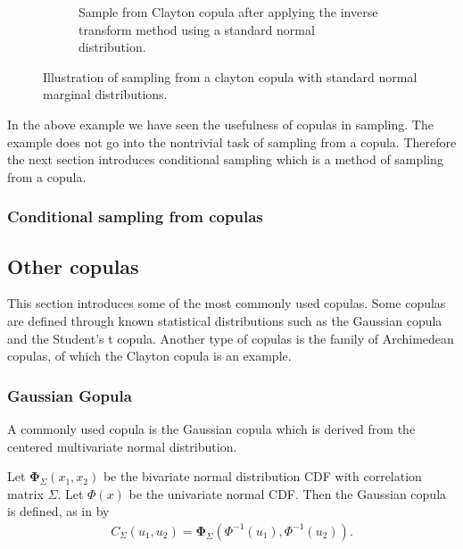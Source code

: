 \begin{figure}[h]
\begin{subfigure}[t]{0.45\linewidth}
        \caption{Sample from Clayton copula after applying the inverse transform method using a standard normal distribution.}
        \label{fig:ReturnSpaceDataClayton}
    \end{subfigure}
    \caption{Illustration of sampling from a clayton copula with standard normal marginal distributions.}
    \label{fig:CopulaSampling}
\end{figure}


In the above example we have seen the usefulness of copulas in sampling. The example does not go into the nontrivial task of sampling from a copula. Therefore the next section introduces conditional sampling which is a method of sampling from a copula. 

\subsubsection{Conditional sampling from copulas}


\subsection{Other copulas}
This section introduces some of the most commonly used copulas. Some copulas are defined through known statistical distributions such as the Gaussian copula and the Student's t copula. Another type of copulas is the family of Archimedean copulas, of which the Clayton copula is an example.

\subsubsection{Gaussian Gopula} 
A commonly used copula is the Gaussian copula which is derived from the centered multivariate normal distribution. 

Let $\boldsymbol{\Phi}_\Sigma(x_1,x_2)$ be the bivariate normal distribution \gls{CDF} with correlation matrix $\Sigma$. Let $\Phi(x)$ be the univariate normal \gls{CDF}. Then the Gaussian copula is defined, as in \citet[p.~112]{Umberto2004copulaMethods}  by 
\begin{align*}
    C_\Sigma(u_1,u_2) = \boldsymbol{\Phi}_\Sigma(\Phi^{-1}(u_1),\Phi^{-1}(u_2)).
\end{align*}

